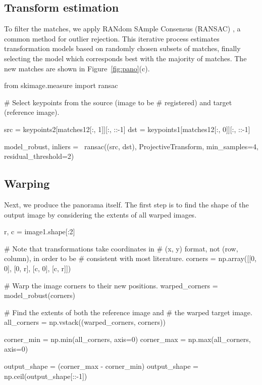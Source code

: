 \documentclass[fleqn,12pt]{wlpeerj}
\begin{document}
\subsection{Transform estimation}
\label{sub:transform_estimation}

To filter the matches, we apply RANdom SAmple Consensus (RANSAC) \citep{ransac}, a common method for outlier rejection. This iterative process estimates transformation models based on randomly chosen subsets of matches, finally selecting the model which corresponds best with the majority of matches. The new matches are shown in Figure~\ref{fig:pano}(c).

\begin{python}
from skimage.measure import ransac

# Select keypoints from the source (image to be
# registered) and target (reference image).

src = keypoints2[matches12[:, 1]][:, ::-1]
dst = keypoints1[matches12[:, 0]][:, ::-1]

model_robust, inliers = \
ransac((src, dst), ProjectiveTransform,
min_samples=4, residual_threshold=2)
\end{python}

\subsection{Warping}
\label{sub:warping}

Next, we produce the panorama itself. The first step is to find the shape of the output image by considering the extents of all warped images.

\begin{python}
r, c = image1.shape[:2]

# Note that transformations take coordinates in
# (x, y) format, not (row, column), in order to be
# consistent with most literature.
corners = np.array([[0, 0],
    [0, r],
    [c, 0],
[c, r]])

# Warp the image corners to their new positions.
warped_corners = model_robust(corners)

# Find the extents of both the reference image and
# the warped target image.
all_corners = np.vstack((warped_corners, corners))

corner_min = np.min(all_corners, axis=0)
corner_max = np.max(all_corners, axis=0)

output_shape = (corner_max - corner_min)
output_shape = np.ceil(output_shape[::-1])
\end{python}
\end{document}
